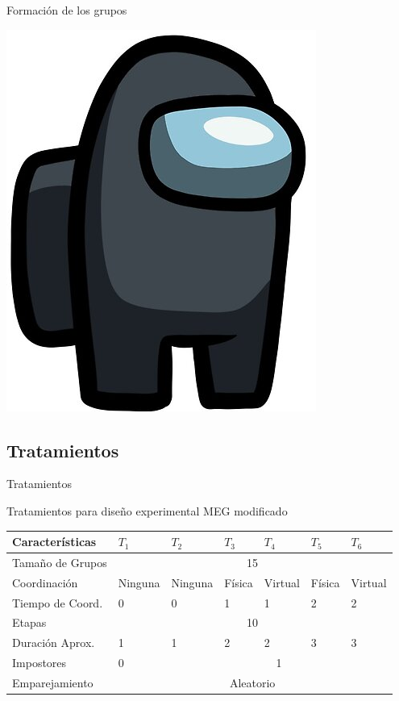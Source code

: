 \documentclass[t,9pt,xcolor=dvipsnames]{beamer}
\begin{document}
\begin{frame}{Formación de los grupos}
\begin{minipage}[c]{0.2 \textwidth}
\includegraphics[scale=0.2]{impostr.png}
\end{minipage}

\end{frame} 
\subsection{Tratamientos}
\begin{frame}{Tratamientos}
\begin{block}{Tratamientos para diseño experimental MEG modificado}
    \begin{table}[H]
\centering 
\begin{tabular}{l|l|lllll}
\toprule
Características             & $T_1$      & $T_2$      & $T_3$     & $T_4$      & $T_5$     & $T_6$      \\
\midrule 
Tamaño de Grupos            & \multicolumn{6}{c}{15}
\\ 
Coordinación                & Ninguna & Ninguna & Física & Virtual & Física & Virtual \\
Tiempo de Coord.      & 0       & 0       & 1      & 1       & 2      & 2       \\
Etapas                      & \multicolumn{6}{c}{10}                                  \\
Duración Aprox. & 1       & 1       & 2      & 2       & 3      & 3       \\
Impostores                  & 0       & \multicolumn{5}{c}{1}  \\
Emparejamiento & \multicolumn{6}{c}{Aleatorio} \\
\bottomrule
\end{tabular}
\end{table}
\end{block}
\end{frame}
\end{document}

